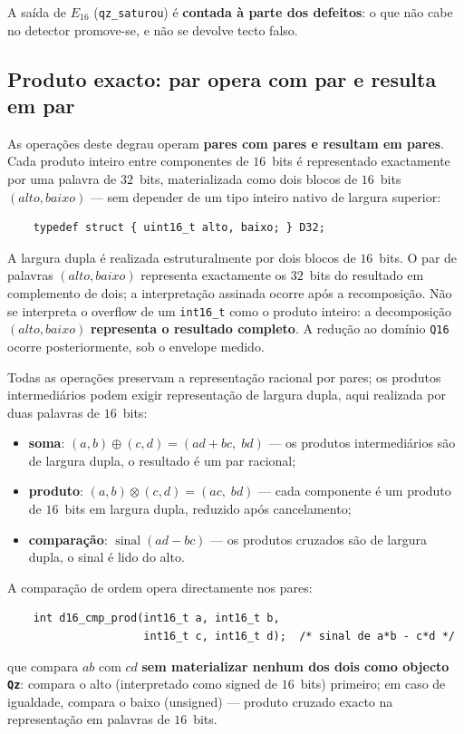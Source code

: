 \documentclass[11pt,a4paper]{article}
\newcommand{\code}[1]{\texttt{\small #1}}
\begin{document}
\noindent A saída de $E_{16}$ (\code{qz\_saturou}) é \textbf{contada à parte dos
defeitos}: o que não cabe no detector promove-se, e não se devolve tecto falso.

\subsection*{Produto exacto: par opera com par e resulta em par}

As operações deste degrau operam \textbf{pares com pares e resultam em pares}.
Cada produto inteiro entre componentes de $16$~bits é representado exactamente
por uma palavra de $32$~bits, materializada como dois blocos de $16$~bits
$(alto,baixo)$ --- sem depender de um tipo inteiro nativo de largura superior:
\begin{verbatim}
    typedef struct { uint16_t alto, baixo; } D32;
\end{verbatim}
A largura dupla é realizada estruturalmente por dois blocos de $16$~bits.
O par de palavras $(alto,baixo)$ representa exactamente os $32$~bits do
resultado em complemento de dois; a interpretação assinada ocorre após a
recomposição. Não se interpreta o overflow de um
\code{int16\_t} como o produto inteiro: a decomposição $(alto,baixo)$
\textbf{representa o resultado completo}. A redução ao domínio \code{Q16}
ocorre posteriormente, sob o envelope medido.

Todas as operações preservam a representação racional por pares; os produtos
intermediários podem exigir representação de largura dupla, aqui realizada por
duas palavras de $16$~bits:
\begin{itemize}
\item \textbf{soma}: $(a,b)\oplus(c,d)=(ad+bc,\;bd)$ --- os produtos
  intermediários são de largura dupla, o resultado é um par racional;
\item \textbf{produto}: $(a,b)\otimes(c,d)=(ac,\;bd)$ --- cada componente é
  um produto de $16$~bits em largura dupla, reduzido após cancelamento;
\item \textbf{comparação}: $\operatorname{sinal}(ad-bc)$ --- os produtos
  cruzados são de largura dupla, o sinal é lido do alto.
\end{itemize}

A comparação de ordem opera directamente nos pares:
\begin{verbatim}
    int d16_cmp_prod(int16_t a, int16_t b,
                     int16_t c, int16_t d);  /* sinal de a*b - c*d */
\end{verbatim}
que compara $ab$ com $cd$ \textbf{sem materializar nenhum dos dois como objecto
\code{Qz}}: compara o alto (interpretado como signed de $16$~bits) primeiro; em caso de
igualdade, compara o baixo (unsigned) --- produto cruzado exacto na
representação em palavras de $16$~bits.
\end{document}
